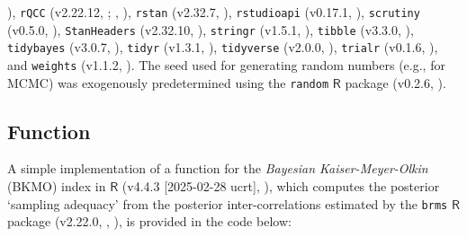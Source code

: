 \documentclass[
  10pt,
  a4paper,
  twoside]{article}
\begin{document}
), \texttt{rQCC} (v2.22.12, ; , ), \texttt{rstan} (v2.32.7, ), \texttt{rstudioapi} (v0.17.1, ), \texttt{scrutiny} (v0.5.0, ), \texttt{StanHeaders} (v2.32.10, ), \texttt{stringr} (v1.5.1, ), \texttt{tibble} (v3.3.0, ), \texttt{tidybayes} (v3.0.7, ), \texttt{tidyr} (v1.3.1, ), \texttt{tidyverse} (v2.0.0, ), \texttt{trialr} (v0.1.6, ), and \texttt{weights} (v1.1.2, ). The seed used for generating random numbers (e.g., for MCMC) was exogenously predetermined using the \texttt{random} \(\textsf{R}\) package (v0.2.6, ).

\newpage

\subsection{Function}\label{sec:sec_bkmo_function_appendix}

A simple implementation of a function for the \emph{Bayesian Kaiser-Meyer-Olkin} (BKMO) index in \(\textsf{R}\) (v4.4.3 {[}2025-02-28 ucrt{]}, ), which computes the posterior `sampling adequacy' from the posterior inter-correlations estimated by the \texttt{brms} \(\textsf{R}\) package (v2.22.0, , ), is provided in the code below:
\end{document}

